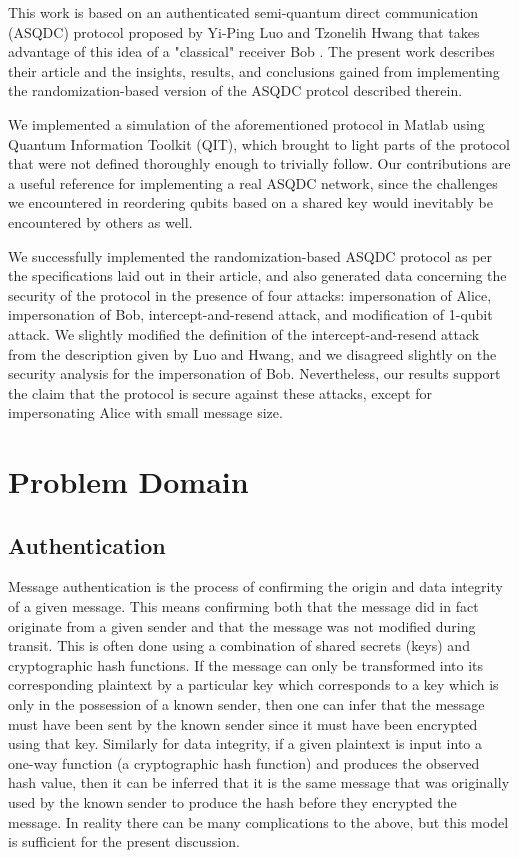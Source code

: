 \documentclass[conference,compsoc]{IEEEtran}
\begin{document}
This work is based on an authenticated semi-quantum direct communication (ASQDC) protocol
proposed by Yi-Ping Luo and Tzonelih Hwang that takes advantage of this idea
of a "classical" receiver Bob \cite{LuoHwang}.
The present work describes their article and the insights,
results, and conclusions gained from implementing the randomization-based version
of the ASQDC protcol described therein.

We implemented a simulation of the aforementioned protocol in Matlab
using Quantum Information Toolkit (QIT), which brought to light parts of the
protocol that were not defined thoroughly enough to trivially follow.
Our contributions are a useful reference for implementing a real ASQDC
network, since the challenges we encountered in reordering qubits based
on a shared key would inevitably be encountered by others as well.

We successfully implemented the randomization-based ASQDC
protocol as per the specifications laid out in their article,
and also generated data concerning the security of the protocol
in the presence of four attacks: impersonation of Alice, impersonation
of Bob, intercept-and-resend attack, and modification of 1-qubit attack.
We slightly modified the definition of the intercept-and-resend attack
from the description given by Luo and Hwang, and we disagreed slightly on the
security analysis for the impersonation of Bob. Nevertheless, our
results support the claim that the protocol is secure against these
attacks, except for impersonating Alice with small message size.

\section{Problem Domain}

\subsection{Authentication}

Message authentication is the process of confirming the origin and
data integrity of a given message. This means confirming both that the
message did in fact originate from a given sender and that the message
was not modified during transit. This is often done using a combination of
shared secrets (keys) and cryptographic hash functions. If the message
can only be transformed into its corresponding plaintext by a particular key
which corresponds to a key which is only in the possession
of a known sender, then one can infer that the message must have been
sent by the known sender since it must have been encrypted using that
key. Similarly for data integrity, if a given plaintext is input
into a one-way function (a cryptographic hash function) and produces
the observed hash value, then it can be inferred that it is the same
message that was originally used by the known sender to produce the
hash before they encrypted the message. In reality there
can be many complications to the above, but this model is sufficient
for the present discussion.
\end{document}
